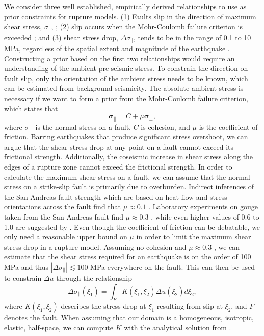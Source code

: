 \documentclass[12pt]{article}
\begin{document}
We consider three well established, empirically derived relationships to use as prior constraints for rupture models. (1) Faults slip in the direction of maximum shear stress, $\sigma_\parallel$, \citep{Wallace1951}; (2) slip occurs when the Mohr-Coulomb failure criterion is exceeded \citep{Byerlee1978}; and (3) shear stress drop, $\Delta \sigma_\parallel$, tends to be in the range of 0.1 to 10 MPa, regardless of the spatial extent and magnitude of the earthquake \citep{Kanamori1975,Shearer2006}.  Constructing a prior based on the first two relationships would require an understanding of the ambient pre-seismic stress.  To constrain the direction on fault slip, only the orientation of the ambient stress needs to be known, which can be estimated from background seismicity.  The absolute ambient stress is necessary if we want to form a prior from the Mohr-Coulomb failure criterion, which states that
\begin{equation}\label{eq:MohrCoulomb}
  \mathbf{\sigma_\parallel} = C + \mu \mathbf{\sigma_\bot},
\end{equation}
where $\sigma_\bot$ is the normal stress on a fault, $C$ is cohesion, and $\mu$ is the coefficient of friction.  Barring earthquakes that produce significant stress overshoot, we can argue that the shear stress drop at any point on a fault cannot exceed its frictional strength.  Additionally, the coseismic increase in shear stress along the edges of a rupture zone cannot exceed the frictional strength. In order to calculate the maximum shear stress on a fault, we can assume that the normal stress on a strike-slip fault is primarily due to overburden.  Indirect inferences of the San Andreas fault strength which are based on heat flow and stress orientations across the fault find that $\mu\approx0.1$ \citep{Brune1969,Zoback1987}.  Laboratory experiments on gouge taken from the San Andreas fault find $\mu\approx0.3$ \citep{Carpenter2011}, while even higher values of 0.6 to 1.0 are suggested by \citet{Byerlee1978}. Even though the coefficient of friction can be debatable, we only need a reasonable upper bound on $\mu$ in order to limit the maximum shear stress drop in a rupture model.  Assuming no cohesion and $\mu\approx0.3$ \citep{Carpenter2011}, we can estimate that the shear stress required for an earthquake is on the order of 100 MPa and thus $|\Delta\sigma_\parallel|\lesssim 100 $ MPa everywhere on the fault.  This can then be used to constrain $\Delta u$ through the relationship
\begin{equation}\label{eq:StressSlip}
  \Delta \sigma_\parallel (\xi_1) = \int_F K(\xi_1,\xi_2) \Delta u(\xi_2) d\xi_2,
\end{equation}
where $K(\xi_1,\xi_2)$ describes the stress drop at $\xi_1$ resulting from slip at $\xi_2$, and $F$ denotes the fault.  When assuming that our domain is a homogeneous, isotropic, elastic, half-space, we can compute $K$ with the analytical solution from \citet{Okada1992}.  
\end{document}
